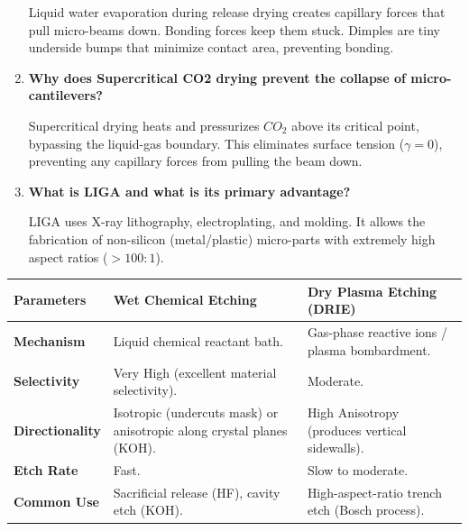 \documentclass[12pt,a4paper]{article}
\newcommand{\Q}[1]{\textbf{#1}\par\noindent\ignorespaces}
\renewcommand{\arraystretch}{1.45}
\begin{document}
\begin{tcolorbox}[exambox, title={\textbf{Frequently Asked / Viva Questions}}]
\begin{enumerate}[topsep=0pt, label=\textbf{Q\arabic*.}, itemsep=5pt]
    Liquid water evaporation during release drying creates capillary forces that pull micro-beams down. Bonding forces keep them stuck. Dimples are tiny underside bumps that minimize contact area, preventing bonding.
  \item \Q{Why does Supercritical CO2 drying prevent the collapse of micro-cantilevers?}
    Supercritical drying heats and pressurizes $CO_2$ above its critical point, bypassing the liquid-gas boundary. This eliminates surface tension ($\gamma = 0$), preventing any capillary forces from pulling the beam down.
  \item \Q{What is LIGA and what is its primary advantage?}
    LIGA uses X-ray lithography, electroplating, and molding. It allows the fabrication of non-silicon (metal/plastic) micro-parts with extremely high aspect ratios ($>100:1$).
\end{enumerate}
\end{tcolorbox}

\begin{tcolorbox}[tikzbox, title={Comparison: Etching Methods in MEMS}]
\renewcommand{\arraystretch}{1.45}
\par\noindent
\begin{tabularx}{\linewidth}{|B{3.2cm}|Y|Y|}
\hline
\textbf{Parameters} & \textbf{\color{myteal}Wet Chemical Etching} & \textbf{\color{mypurple}Dry Plasma Etching (DRIE)} \\
\hline
\textbf{Mechanism} & Liquid chemical reactant bath. & Gas-phase reactive ions / plasma bombardment. \\
\hline
\textbf{Selectivity} & Very High (excellent material selectivity). & Moderate. \\
\hline
\textbf{Directionality} & Isotropic (undercuts mask) or anisotropic along crystal planes (KOH). & High Anisotropy (produces vertical sidewalls). \\
\hline
\textbf{Etch Rate} & Fast. & Slow to moderate. \\
\hline
\textbf{Common Use} & Sacrificial release (HF), cavity etch (KOH). & High-aspect-ratio trench etch (Bosch process). \\
\hline
\end{tabularx}
\end{tcolorbox}
\end{document}
